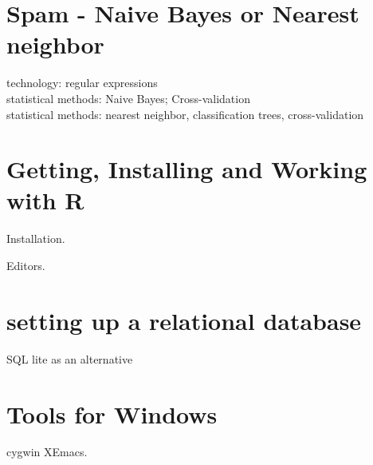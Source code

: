 \documentclass[11pt,timesroman]{article}
\begin{document}
\section{Spam - Naive Bayes or Nearest neighbor}
technology: regular expressions
\\
statistical methods: Naive Bayes; Cross-validation
\\
statistical methods: nearest neighbor, classification trees,
cross-validation



\appendix

\section{Getting, Installing and Working with R}
Installation.

Editors.

\section{setting up a relational database}
SQL lite as an alternative

\section{Tools for Windows}

cygwin
XEmacs.
\end{document}

